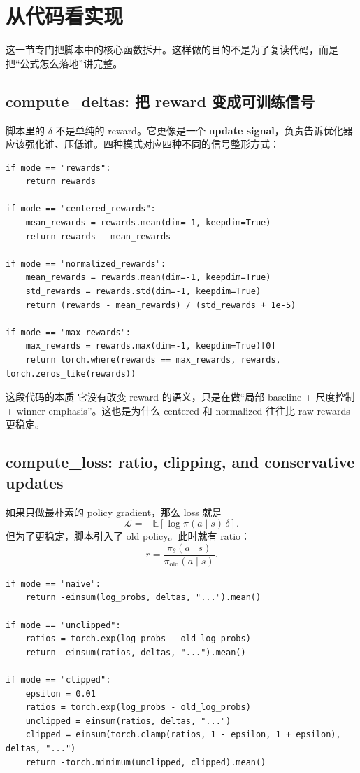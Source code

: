 \section{从代码看实现}

这一节专门把脚本中的核心函数拆开。这样做的目的不是为了复读代码，而是把“公式怎么落地”讲完整。

\subsection{compute\_deltas: 把 reward 变成可训练信号}

脚本里的 $\delta$ 不是单纯的 reward。它更像是一个 \textbf{update signal}，负责告诉优化器应该强化谁、压低谁。四种模式对应四种不同的信号整形方式：

\begin{lstlisting}[caption={compute\_deltas: reward to update signal}]
if mode == "rewards":
    return rewards

if mode == "centered_rewards":
    mean_rewards = rewards.mean(dim=-1, keepdim=True)
    return rewards - mean_rewards

if mode == "normalized_rewards":
    mean_rewards = rewards.mean(dim=-1, keepdim=True)
    std_rewards = rewards.std(dim=-1, keepdim=True)
    return (rewards - mean_rewards) / (std_rewards + 1e-5)

if mode == "max_rewards":
    max_rewards = rewards.max(dim=-1, keepdim=True)[0]
    return torch.where(rewards == max_rewards, rewards, torch.zeros_like(rewards))
\end{lstlisting}

\begin{importantbox}{这段代码的本质}
它没有改变 reward 的语义，只是在做“局部 baseline + 尺度控制 + winner emphasis”。这也是为什么 centered 和 normalized 往往比 raw rewards 更稳定。
\end{importantbox}

\subsection{compute\_loss: ratio, clipping, and conservative updates}

如果只做最朴素的 policy gradient，那么 loss 就是
\[
\mathcal{L} = -\mathbb{E}[\log \pi(a \mid s)\,\delta].
\]
但为了更稳定，脚本引入了 old policy。此时就有 ratio：
\[
r = \frac{\pi_\theta(a\mid s)}{\pi_{\text{old}}(a\mid s)}.
\]

\begin{lstlisting}[caption={compute\_loss: naive / unclipped / clipped}]
if mode == "naive":
    return -einsum(log_probs, deltas, "...").mean()

if mode == "unclipped":
    ratios = torch.exp(log_probs - old_log_probs)
    return -einsum(ratios, deltas, "...").mean()

if mode == "clipped":
    epsilon = 0.01
    ratios = torch.exp(log_probs - old_log_probs)
    unclipped = einsum(ratios, deltas, "...")
    clipped = einsum(torch.clamp(ratios, 1 - epsilon, 1 + epsilon), deltas, "...")
    return -torch.minimum(unclipped, clipped).mean()
\end{lstlisting}

